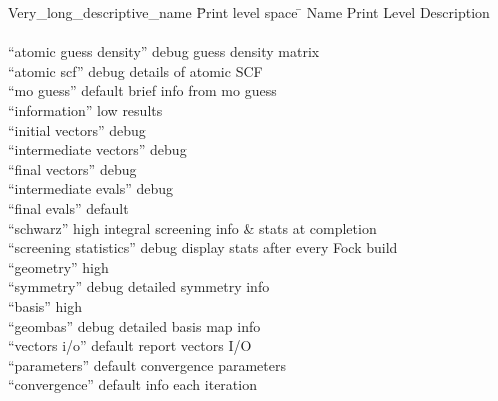 \begin{tabbing}
  Very\_long\_descriptive\_name \= Print level space \= \kill
  Name                    \> Print Level \> Description \\
                          \>        \> \\
 ``atomic guess density'' \> debug  \> guess density matrix \\
 ``atomic scf''           \> debug  \> details of atomic SCF \\
 ``mo guess''             \> default\> brief info from mo guess \\
 ``information''          \> low    \> results  \\
 ``initial vectors''      \> debug  \> \\
 ``intermediate vectors'' \> debug  \> \\
 ``final vectors''        \> debug  \> \\
 ``intermediate evals''   \> debug  \> \\
 ``final evals''          \> default\> \\
 ``schwarz''              \> high   \> integral screening info \&
  stats at completion\\
 ``screening statistics'' \> debug  \> display stats after every Fock build \\
 ``geometry''             \> high   \> \\
 ``symmetry''             \> debug  \> detailed symmetry info \\
 ``basis''                \> high   \> \\
 ``geombas''              \> debug  \> detailed basis map info \\
 ``vectors i/o''          \> default\> report vectors I/O \\
 ``parameters''           \> default\> convergence parameters \\
 ``convergence''          \> default\> info each iteration
\end{tabbing}
